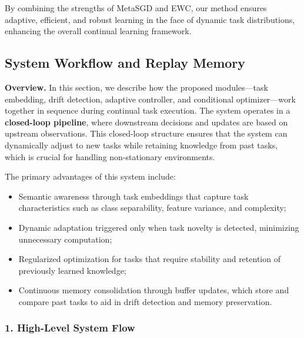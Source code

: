 \documentclass[conference]{IEEEtran}
\begin{document}
By combining the strengths of MetaSGD and EWC, our method ensures adaptive, efficient, and robust learning in the face of dynamic task distributions, enhancing the overall continual learning framework.

\subsection{System Workflow and Replay Memory}

\textbf{Overview.}  
In this section, we describe how the proposed modules—task embedding, drift detection, adaptive controller, and conditional optimizer—work together in sequence during continual task execution. The system operates in a \textbf{closed-loop pipeline}, where downstream decisions and updates are based on upstream observations. This closed-loop structure ensures that the system can dynamically adjust to new tasks while retaining knowledge from past tasks, which is crucial for handling non-stationary environments.

The primary advantages of this system include:
\begin{itemize}
    \item Semantic awareness through task embeddings that capture task characteristics such as class separability, feature variance, and complexity;
    \item Dynamic adaptation triggered only when task novelty is detected, minimizing unnecessary computation;
    \item Regularized optimization for tasks that require stability and retention of previously learned knowledge;
    \item Continuous memory consolidation through buffer updates, which store and compare past tasks to aid in drift detection and memory preservation.
\end{itemize}

\subsubsection*{1. High-Level System Flow}
\vspace{0.8em}
\end{document}
